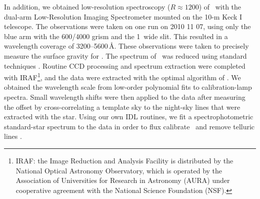%
%
%
%

In addition, we obtained low-resolution spectroscopy ($R\approx1200$) of
\starb\ with the dual-arm Low-Resolution Imaging Spectrometer \citep[LRIS;][]{Oke95} mounted on the 10-m Keck I telescope. The
observations were taken on one run on 2010 11 07, using only the blue
arm with the 600/4000 grism and the 1\arcsec\ wide slit. This resulted
in a wavelength coverage of 3200--5600\,\AA. These observations
were taken to precisely measure the surface gravity for \starb.
The spectrum of \starb\ was reduced using standard techniques \citep[e.g.][]{Foley03}. Routine CCD processing and spectrum extraction
were completed with IRAF\footnote{IRAF: the Image Reduction and
Analysis Facility is distributed by the National Optical Astronomy
Observatory, which is operated by the Association of Universities for
Research in Astronomy (AURA) under cooperative agreement with the
National Science Foundation (NSF).}, and the data were extracted with
the optimal algorithm of \citet{Horne86}. We obtained the wavelength
scale from low-order polynomial fits to calibration-lamp spectra.
Small wavelength shifts were then applied to the data after measuring the offset by
cross-correlating a template sky to the night-sky lines that were
extracted with the star. Using our own IDL routines, we fit a
spectrophotometric standard-star spectrum to the data in order to flux
calibrate \starb\ and remove telluric lines \citep{Horne86,Matheson00}.


